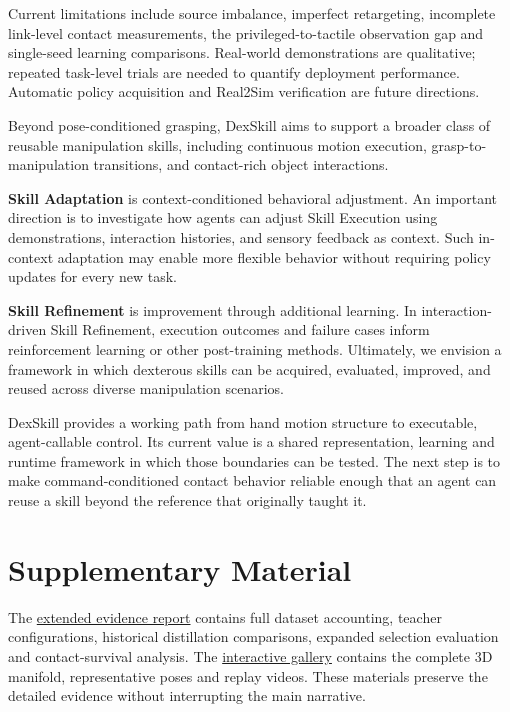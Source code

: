 \documentclass[10pt,twocolumn]{article}
\begin{document}
Current limitations include source imbalance, imperfect retargeting, incomplete link-level contact measurements, the privileged-to-tactile observation gap and single-seed learning comparisons. Real-world demonstrations are qualitative; repeated task-level trials are needed to quantify deployment performance. Automatic policy acquisition and Real2Sim verification are future directions.

Beyond pose-conditioned grasping, DexSkill aims to support a broader class of reusable manipulation skills, including continuous motion execution, grasp-to-manipulation transitions, and contact-rich object interactions.

\textbf{Skill Adaptation} is context-conditioned behavioral adjustment. An important direction is to investigate how agents can adjust Skill Execution using demonstrations, interaction histories, and sensory feedback as context. Such in-context adaptation may enable more flexible behavior without requiring policy updates for every new task.

\textbf{Skill Refinement} is improvement through additional learning. In interaction-driven Skill Refinement, execution outcomes and failure cases inform reinforcement learning or other post-training methods. Ultimately, we envision a framework in which dexterous skills can be acquired, evaluated, improved, and reused across diverse manipulation scenarios.

DexSkill provides a working path from hand motion structure to executable, agent-callable control. Its current value is a shared representation, learning and runtime framework in which those boundaries can be tested. The next step is to make command-conditioned contact behavior reliable enough that an agent can reuse a skill beyond the reference that originally taught it.

\section*{Supplementary Material}

The \href{supplementary_report.html}{extended evidence report} contains full dataset accounting, teacher configurations, historical distillation comparisons, expanded selection evaluation and contact-survival analysis. The \href{pose_hoi_manifold.html}{interactive gallery} contains the complete 3D manifold, representative poses and replay videos. These materials preserve the detailed evidence without interrupting the main narrative.



\end{document}
